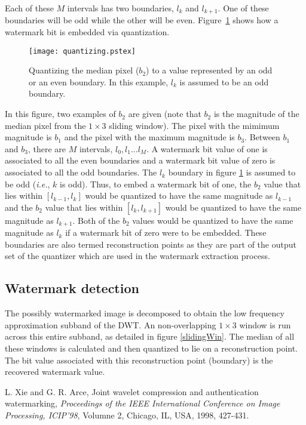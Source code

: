 \documentclass[12pt]{article}
\begin{document}
Each of these $M$ intervals has two boundaries, $l_{k}$ and $l_{k+1}$. One of these boundaries will be odd
while the other will be even. Figure~\ref{fig-quantizing} shows how a watermark bit is embedded via quantization.
\begin{figure}[hbt]
        \begin{center} 
                \texttt{[image: quantizing.pstex]} 
		\caption{Quantizing the median pixel ($b_{2}$) to a value represented by an odd or an even boundary.
			In this example, $l_{k}$ is assumed to be an odd boundary.}
		\label{fig-quantizing}
	\end{center}
\end{figure}  
In this figure, two examples of $b_{2}$ are given (note that $b_{2}$ is the magnitude of the median pixel from 
the $1 \times 3$ sliding window). The pixel with the mimimum magnitude is $b_{1}$ and the pixel with the 
maximum magnitude is $b_{3}$. Between $b_{1}$ and $b_{3}$, there are $M$ intervals, $l_{0}, l_{1} ... l_{M}$.
A watermark bit value of one is associated to all the even boundaries and a watermark bit value of zero 
is associated to all the odd boundaries. The $l_{k}$ boundary in figure \ref{fig-quantizing} is assumed to be odd
(\emph{i.e.}, $k$ is odd).
Thus, to embed a watermark bit of one, the $b_{2}$ value that lies within $[l_{k-1},l_{k}]$ would
be quantized to have the same magnitude as $l_{k-1}$ and the $b_{2}$ value that lies within $[l_{k},l_{k+1}]$
would be quantized to have the same magnitude as $l_{k+1}$. Both of the $b_{2}$ values would be quantized to 
have the same magnitude as $l_{k}$ if a watermark bit of zero were to be embedded.
These boundaries are also termed reconstruction points as they are part of the output set of the quantizer 
which are used in the watermark extraction process.

\subsection{Watermark detection}
The possibly watermarked image is decomposed to obtain the low frequency approximation subband of the DWT.
An non-overlapping $1 \times 3$ window is run across this entire subband, as detailed in figure \ref{slidingWin}.
The median of all these windows is calculated and then quantized to lie on a reconstruction point. 
The bit value associated with this reconstruction point (boundary) is the recovered watermark value.





			
\begin{thebibliography}{00}
	L. Xie and G. R. Arce, Joint wavelet compression and authentication
	watermarking, \emph{Proceedings of the IEEE International Conference on Image Processing, ICIP'98}, 
	Volumne 2, Chicago, IL, USA, 1998, 427-431.
\end{thebibliography}
\end{document}

